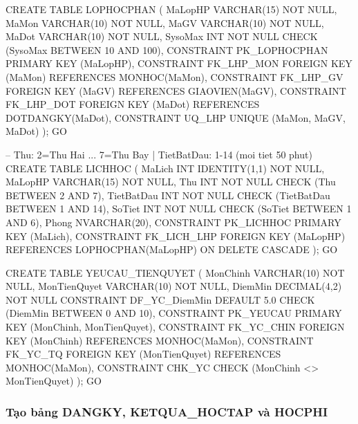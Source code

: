 \documentclass[13pt, a4paper]{article}
\begin{document}
\begin{sqlbox}
CREATE TABLE LOPHOCPHAN (
    MaLopHP  VARCHAR(15) NOT NULL,
    MaMon    VARCHAR(10) NOT NULL,
    MaGV     VARCHAR(10) NOT NULL,
    MaDot    VARCHAR(10) NOT NULL,
    SysoMax  INT         NOT NULL CHECK (SysoMax BETWEEN 10 AND 100),
    CONSTRAINT PK_LOPHOCPHAN PRIMARY KEY (MaLopHP),
    CONSTRAINT FK_LHP_MON    FOREIGN KEY (MaMon) REFERENCES MONHOC(MaMon),
    CONSTRAINT FK_LHP_GV     FOREIGN KEY (MaGV)  REFERENCES GIAOVIEN(MaGV),
    CONSTRAINT FK_LHP_DOT    FOREIGN KEY (MaDot) REFERENCES DOTDANGKY(MaDot),
    CONSTRAINT UQ_LHP        UNIQUE (MaMon, MaGV, MaDot)
);
GO

-- Thu: 2=Thu Hai ... 7=Thu Bay | TietBatDau: 1-14 (moi tiet 50 phut)
CREATE TABLE LICHHOC (
    MaLich     INT IDENTITY(1,1) NOT NULL,
    MaLopHP    VARCHAR(15)       NOT NULL,
    Thu        INT               NOT NULL CHECK (Thu BETWEEN 2 AND 7),
    TietBatDau INT               NOT NULL CHECK (TietBatDau BETWEEN 1 AND 14),
    SoTiet     INT               NOT NULL CHECK (SoTiet BETWEEN 1 AND 6),
    Phong      NVARCHAR(20),
    CONSTRAINT PK_LICHHOC  PRIMARY KEY (MaLich),
    CONSTRAINT FK_LICH_LHP FOREIGN KEY (MaLopHP)
        REFERENCES LOPHOCPHAN(MaLopHP) ON DELETE CASCADE
);
GO

CREATE TABLE YEUCAU_TIENQUYET (
    MonChinh     VARCHAR(10)  NOT NULL,
    MonTienQuyet VARCHAR(10)  NOT NULL,
    DiemMin      DECIMAL(4,2) NOT NULL
                 CONSTRAINT DF_YC_DiemMin DEFAULT 5.0
                 CHECK (DiemMin BETWEEN 0 AND 10),
    CONSTRAINT PK_YEUCAU PRIMARY KEY (MonChinh, MonTienQuyet),
    CONSTRAINT FK_YC_CHIN FOREIGN KEY (MonChinh)     REFERENCES MONHOC(MaMon),
    CONSTRAINT FK_YC_TQ   FOREIGN KEY (MonTienQuyet) REFERENCES MONHOC(MaMon),
    CONSTRAINT CHK_YC     CHECK (MonChinh <> MonTienQuyet)
);
GO
\end{sqlbox}

\subsubsection{Tạo bảng DANGKY, KETQUA\_HOCTAP và HOCPHI}
\end{document}
